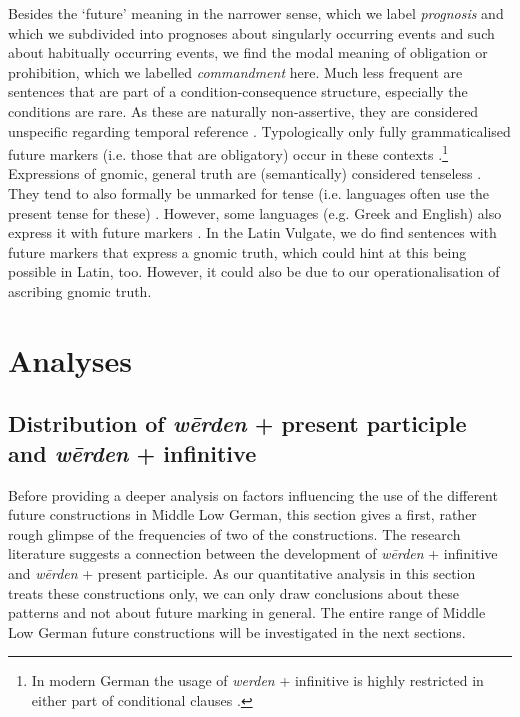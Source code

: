 \documentclass[output=paper,colorlinks,citecolor=brown]{langscibook}
\begin{document}
Besides the `future' meaning in the narrower sense, which we label \textit{prognosis} and which we subdivided into prognoses about singularly occurring events and such about habitually occurring events, we find the modal meaning of obligation or prohibition, which we labelled \textit{commandment} here. Much less frequent are sentences that are part of a condition-consequence structure, especially the conditions are rare. As these are naturally non-assertive, they are considered unspecific regarding temporal reference \citep[314]{Dahl2000}. Typologically only fully grammaticalised future markers (i.e. those that are obligatory) occur in these contexts \citep[314]{Dahl2000}.\footnote{In modern German the usage of \textit{werden} + infinitive is highly restricted in either part of conditional clauses \citep[]{vater1975}.}
Expressions of gnomic, general truth are (semantically) considered tenseless \citep[87]{Ultan1978}. They tend to also formally be unmarked for tense (i.e. languages often use the present tense for these) \citep[87]{Ultan1978}. However, some languages (e.g. Greek and English) also express it with future markers \citep[87]{Ultan1978}. In the Latin Vulgate, we do find sentences with future markers that express a gnomic truth, which could hint at this being possible in Latin, too. However, it could also be due to our operationalisation of ascribing gnomic truth. 

\section{Analyses}\label{chap:results}

\subsection{Distribution of \textit{wērden} + present participle and \textit{wērden} + infinitive}\label{chap:freq}
Before providing a deeper analysis on factors influencing the use of the different future constructions in Middle Low German, this section gives a first, rather rough glimpse of the frequencies of two of the constructions. The research literature suggests a connection between the development of \textit{wērden} + infinitive and \textit{wērden} + present participle. As our quantitative analysis in this section treats these constructions only, we can only draw conclusions about these patterns and not about future marking in general. The entire range of Middle Low German future constructions will be investigated in the next sections.
\end{document}
